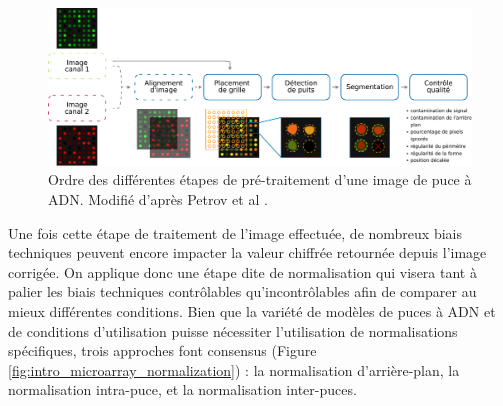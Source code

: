 \begin{figure}[!h]
    \centering
    \includegraphics[width=\textwidth]{img/intro/2_meth_transcripto/intro_2_microarray_image_preprocessing.pdf}
    \caption[Ordre des différentes étapes de pré-traitement d'une image de puce à ADN]{Ordre des différentes étapes de pré-traitement d'une image de puce à ADN. Modifié d'après Petrov et al \cite{Petrov2004Nov}.}
    \label{fig:intro_microarray_image_preprocessing}
\end{figure}

Une fois cette étape de traitement de l'image effectuée, de nombreux biais techniques peuvent encore impacter la valeur chiffrée retournée depuis l'image corrigée. On applique donc une étape dite de normalisation qui visera tant à palier les biais techniques contrôlables qu'incontrôlables afin de comparer au mieux différentes conditions. Bien que la variété de modèles de puces à ADN et de conditions d'utilisation puisse nécessiter l'utilisation de normalisations spécifiques, trois approches font consensus \cite{Smyth2003Dec} (Figure \ref{fig:intro_microarray_normalization}) : la normalisation d'arrière-plan, la normalisation intra-puce, et la normalisation inter-puces.


